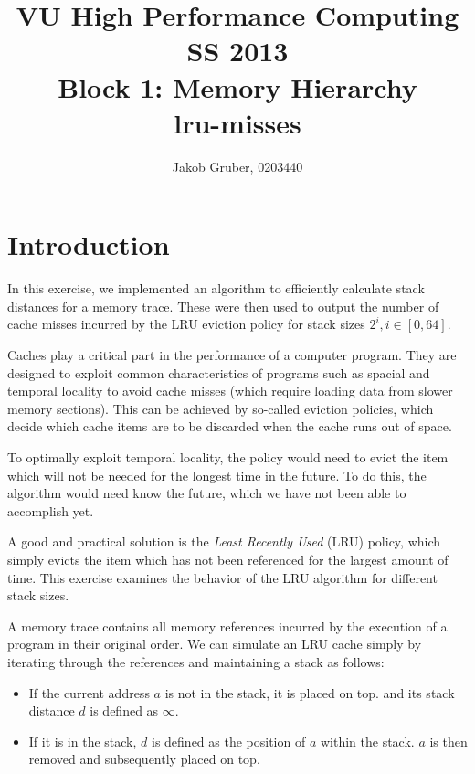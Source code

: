 \documentclass[a4paper,10pt]{article}
\title{VU High Performance Computing \\
       SS 2013 \\
       Block 1: Memory Hierarchy \\
       lru-misses}
\author{Jakob Gruber, 0203440}
\begin{document}
\maketitle

\tableofcontents

\pagebreak

\section{Introduction} \label{section:introduction}

In this exercise, we implemented an algorithm to efficiently calculate stack distances
for a memory trace. These were then used to output the number of cache misses incurred by the
LRU eviction policy for stack sizes $2^i, i \in [0, 64]$.

Caches play a critical part in the performance of a computer program.
They are designed to exploit common characteristics of programs such as
spacial and temporal locality to avoid cache misses (which require
loading data from slower memory sections). This can be achieved by
so-called eviction policies, which decide which cache items are
to be discarded when the cache runs out of space.

To optimally exploit temporal locality, the policy would need to evict
the item which will not be needed for the longest time in the future. To do this, the algorithm would need know the future, which we have not been able to accomplish yet.

A good and practical solution is the \emph{Least Recently Used} (LRU)
policy, which simply evicts the item which has not been referenced for the largest amount of time. This exercise examines the behavior of the LRU algorithm for different stack sizes.

A memory trace contains all memory references incurred by the execution
of a program in their original order. We can simulate an LRU cache simply by iterating through the references and maintaining a stack as follows: 

\begin{itemize}
\item If the current address $a$ is not in the stack, it is placed on top.      and its stack distance $d$ is defined as $\infty$.
\item If it is in the stack, $d$ is defined as the position of $a$ within the stack.
      $a$ is then removed and subsequently placed on top.
\end{itemize}
\end{document}
